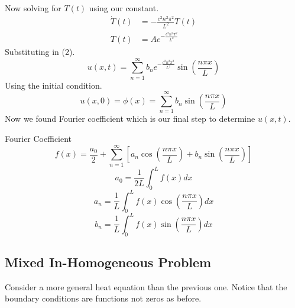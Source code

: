 \documentclass[]{article}
\begin{document}
Now solving for $T(t)$ using our constant.
\begin{align*}
\dot{T}(t) &= -\frac{c^2 n^2 \pi^2}{L^2} T(t)
\\
T(t) &= Ae^{\textstyle -\frac{c^2 n^2 \pi^2}{L^2}}
\end{align*}
Substituting in (2).
\[
    u(x,t) = \sum_{n=1}^{\infty} b_n e^{\textstyle -\frac{c^2 n^2 \pi^2}{L^2}}\sin\left(\frac{n\pi x}{L}\right)    
\]
Using the initial condition.
\[
    u(x,0) = \phi(x) = \sum_{n=1}^{\infty} b_n \sin\left(\frac{n\pi x}{L}\right)    
\]
Now we found Fourier coefficient which is our final step to determine $u(x,t)$.
\begin{enrichment*}{Fourier Coefficient}
    \[
        f(x) = \frac{a_0}{2}  + \sum_{n=1}^{\infty}\left[a_n \cos\left(\frac{n\pi x}{L}\right) + b_n \sin\left(\frac{n\pi x}{L}\right) \right]
    \]
    \[
        a_0 = \frac{1}{2L}\int_{0}^{L}f(x)dx
    \]
    \[
        a_n = \frac{1}{L}\int_{0}^{L}f(x)\cos\left(\frac{n\pi x}{L}\right)dx
    \]
    \[
        b_n = \frac{1}{L}\int_{0}^{L}f(x)\sin\left(\frac{n\pi x}{L}\right)dx
    \]
\end{enrichment*}

\setcounter{equation}{0}
\subsection{Mixed In-Homogeneous Problem}
Consider a more general heat equation than the previous one. Notice that the boundary conditions are functions not zeros as before.
\end{document}
